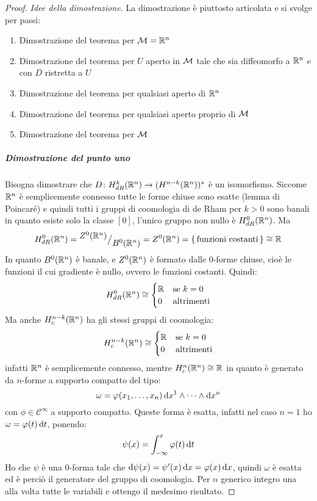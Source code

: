 \begin{proof} \emph{Idee della dimostrazione.}
  La dimostrazione è piuttosto articolata e si svolge per passi:
  \begin{enumerate}
  \item Dimostrazione del teorema per $ \mathcal{M} = \mathbb{R}^{n} $
  \item Dimostrazione del teorema per $ U $ aperto in $ \mathcal{M} $ tale che sia diffeomorfo a $ \mathbb{R}^{n} $
    e con $ D $ ristretta a $ U $
  \item Dimostrazione del teorema per qualsiasi aperto di $ \mathbb{R}^{n} $
  \item Dimostrazione del teorema per qualsiasi aperto proprio di $ \mathcal{M} $
  \item Dimostrazione del teorema per $ \mathcal{M} $
  \end{enumerate}

  \subparagraph{Dimostrazione del punto uno} Bisogna dimostrare che
  $ D \colon H^k_{dR}(\mathbb{R}^{n}) \to (H^{n-k}(\mathbb{R}^{n}))^* $ è un isomorfismo. Siccome
  $ \mathbb{R}^{n} $ è semplicemente connesso tutte le forme chiuse sono esatte (lemma
  di Poincaré) e quindi tutti i gruppi di coomologia di de Rham per $ k > 0 $
  sono banali in quanto esiste solo la classe $ [0] $, l'unico gruppo non nullo
  è $ H^0_{dR}(\mathbb{R}^{n}) $. Ma
  \[
    H^0_{dR}(\mathbb{R}^{n}) = {^{\textstyle Z^0(\mathbb{R}^{n})}\big/_{\textstyle B^0(\mathbb{R}^{n})}} = Z^0(\mathbb{R}^{n}) =
    {\set{\text{funzioni costanti}}} \cong \mathbb{R}^{}
  \]
  In quanto $ B^0(\mathbb{R}^{n}) $ è banale, e $ Z^0(\mathbb{R}^{n}) $ è formato dalle
  $ 0 $-forme chiuse, cioè le funzioni il cui gradiente è nullo, ovvero le
  funzioni costanti. Quindi:
  \[
    H^0_{dR}(\mathbb{R}^{n}) \cong
    \begin{cases}
      \mathbb{R}^{} & \text{se } k = 0 \\
      0 & \text{altrimenti}
    \end{cases}
  \]
  Ma anche $ H^{n-k}_c(\mathbb{R}^{n}) $ ha gli stessi gruppi di coomologia:
  \[
    H^{n-k}_c(\mathbb{R}^{n}) \cong
    \begin{cases}
      \mathbb{R}^{} & \text{se } k = 0 \\
      0 & \text{altrimenti}
    \end{cases}
  \]
  infatti $ \mathbb{R}^{n} $ è semplicemente connesso, mentre
  $ H^{n}_c(\mathbb{R}^{n}) \cong \mathbb{R}^{} $ in quanto è generato da $ n $-forme a supporto compatto del tipo:
  \[
    \omega = \varphi(x_1, \dots, x_n) \operatorname{d}\!{x}^1 \wedge \dots \wedge \operatorname{d}\!{x}^n
  \]
  con $ \phi \in \mathcal{C}^\infty $ a supporto compatto. Queste forma è esatta, infatti
  nel caso $ n = 1 $ ho $ \omega = \varphi(t) \operatorname{d}\!{t} $, ponendo:
  \[
    \psi(x) = \int_{-\infty}^x \varphi(t) \operatorname{d}\!{t}
  \]
  Ho che $ \psi $ è una $ 0 $-forma tale che
  $ \operatorname{d}\!{\psi} (x) = \psi'(x) \operatorname{d}\!{x} = \varphi(x) \operatorname{d}\!{x} $, quindi $ \omega $ è esatta ed è perciò il
  generatore del gruppo di coomologia. Per $ n $ generico integro una alla volta
  tutte le variabili e ottengo il medesimo risultato.


\end{proof}

